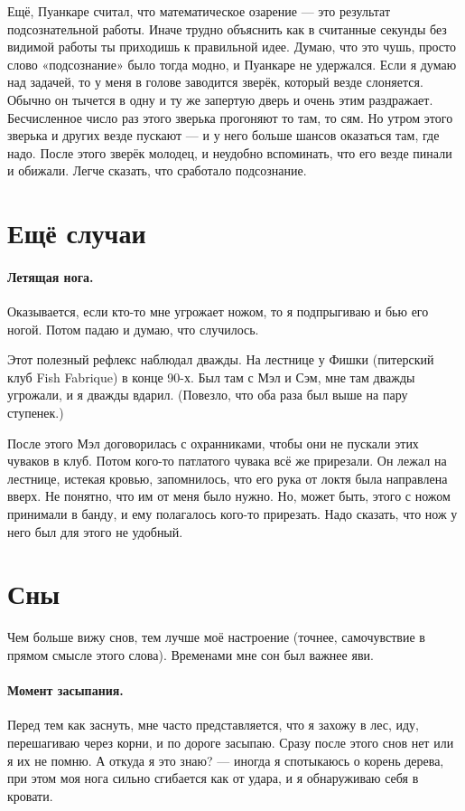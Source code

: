 \documentclass{book}
\begin{document}
Ещё, Пуанкаре считал, что математическое озарение --- это результат подсознательной работы.
Иначе трудно объяснить как в считанные секунды без видимой работы ты приходишь к правильной идее.
Думаю, что это чушь, просто слово «подсознание» было тогда модно, и Пуанкаре не удержался.
Если я думаю над задачей, то у меня в голове заводится зверёк, который везде слоняется.
Обычно он тычется в одну и ту же запертую дверь и очень этим раздражает.
Бесчисленное число раз этого зверька прогоняют то там, то сям.
Но утром этого зверька и других везде пускают --- и у него больше шансов оказаться там, где надо.
После этого зверёк молодец, и неудобно вспоминать, что его везде пинали и обижали.
Легче сказать, что сработало подсознание.


\section*{Ещё случаи}

\paragraph{Летящая нога.}
Оказывается, если кто-то мне угрожает ножом, то я подпрыгиваю и бью его ногой.
Потом падаю и думаю, что случилось.

Этот полезный рефлекс наблюдал дважды.
На лестнице у Фишки (питерский клуб Fish Fabrique) в конце 90-х.
Был там с Мэл и Сэм, мне там дважды угрожали, и я дважды вдарил.
(Повезло, что оба раза был выше на пару ступенек.)

После этого Мэл договорилась с охранниками, чтобы они не пускали этих чуваков в клуб.
Потом кого-то патлатого чувака всё же прирезали.
Он лежал на лестнице, истекая кровью, запомнилось, что его рука от локтя была направлена вверх. 
Не понятно, что им от меня было нужно.
Но, может быть, этого с ножом принимали в банду, и ему полагалось кого-то прирезать.
Надо сказать, что нож у него был для этого не удобный.

\section*{Сны}

Чем больше вижу снов, тем лучше моё настроение (точнее, самочувствие в прямом смысле этого слова).
Временами мне сон был важнее яви.

\paragraph{Момент засыпания.}
Перед тем как заснуть, мне часто представляется, что я захожу в лес, иду, перешагиваю через корни, и по дороге засыпаю.
Сразу после этого снов нет или я их не помню.
А откуда я это знаю? --- иногда я спотыкаюсь о корень дерева, при этом моя нога сильно сгибается как от удара, и я обнаруживаю себя в кровати.
\end{document}
